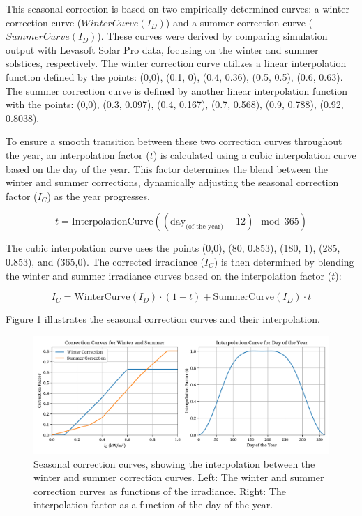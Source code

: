 \documentclass[draft, final]{vutinfth} %
\begin{document}
This seasonal correction is based on two empirically determined curves: a winter correction curve ($WinterCurve(I_D)$) and a summer correction curve ($SummerCurve(I_D)$). These curves were derived by comparing simulation output with Levasoft Solar Pro data, focusing on the winter and summer solstices, respectively. The winter correction curve utilizes a linear interpolation function defined by the points: (0,0), (0.1, 0), (0.4, 0.36), (0.5, 0.5), (0.6, 0.63). The summer correction curve is defined by another linear interpolation function with the points: (0,0), (0.3, 0.097), (0.4, 0.167), (0.7, 0.568), (0.9, 0.788), (0.92, 0.8038).

To ensure a smooth transition between these two correction curves throughout the year, an interpolation factor ($t$) is calculated using a cubic interpolation curve based on the day of the year. This factor determines the blend between the winter and summer corrections, dynamically adjusting the seasonal correction factor ($I_C$) as the year progresses.

\begin{equation} \label{eq:interpolation_factor}
t = \text{InterpolationCurve}\left(\left(\text{day}_{\text{(of the year)}} - 12\right) \mod 365\right)
\end{equation}

The cubic interpolation curve uses the points (0,0), (80, 0.853), (180, 1), (285, 0.853), and (365,0). The corrected irradiance ($I_C$) is then determined by blending the winter and summer irradiance curves based on the interpolation factor ($t$):

\begin{equation} \label{eq:seasonal_irradiance}
I_C = \text{WinterCurve}(I_D) \cdot (1 - t) + \text{SummerCurve}(I_D) \cdot t
\end{equation}

Figure \ref{fig:seasonal_correction_curves} illustrates the seasonal correction curves and their interpolation.

\begin{figure}[h]
    \centering
    \includegraphics[width=\textwidth]{graphics/correction.pdf}
    \caption{Seasonal correction curves, showing the interpolation between the winter and summer correction curves. Left: The winter and summer correction curves as functions of the irradiance. Right: The interpolation factor as a function of the day of the year.}
    \label{fig:seasonal_correction_curves}
\end{figure}
\end{document}
